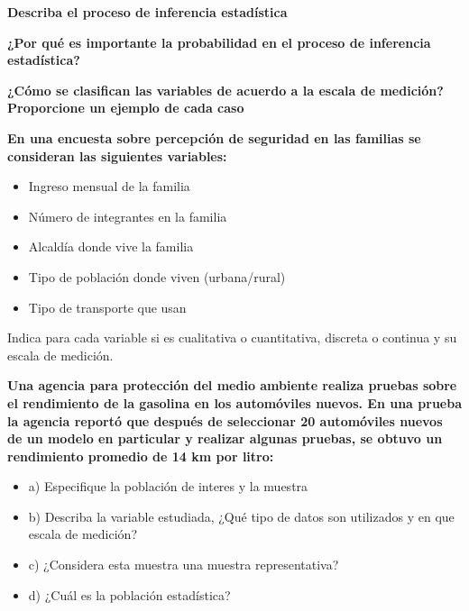 \documentclass{oxmathproblems}
\begin{document}
\begin{questions}

\miquestion \textbf{Describa el proceso de inferencia estadística}

\miquestion \textbf{¿Por qué es importante la probabilidad en el proceso de inferencia estadística?}

\miquestion \textbf{¿Cómo se clasifican las variables de acuerdo a la escala de medición? Proporcione un ejemplo de cada caso}

\miquestion \textbf{En una encuesta sobre percepción de seguridad en las familias se consideran las siguientes variables:}
\begin{itemize}
\item Ingreso mensual de la familia
\item Número de integrantes en la familia
\item Alcaldía donde vive la familia
\item Tipo de población donde viven (urbana/rural)
\item Tipo de transporte que usan
\end{itemize}
Indica para cada variable si es cualitativa o cuantitativa, discreta o continua y su escala de medición.

\miquestion \textbf{Una agencia para protección del medio ambiente realiza pruebas sobre el rendimiento de la gasolina en los automóviles nuevos. En una prueba la agencia reportó que después de seleccionar 20 automóviles nuevos de un modelo en particular y realizar algunas pruebas, se obtuvo un rendimiento promedio de 14 km por litro:}
\begin{itemize}
\item a) Especifique la población de interes y la muestra
\item b) Describa la variable estudiada, ¿Qué tipo de datos son utilizados y en que escala de medición?
\item c) ¿Considera esta muestra una muestra representativa?
\item d) ¿Cuál es la población estadística?
\end{itemize}

\end{questions}
\end{document}
